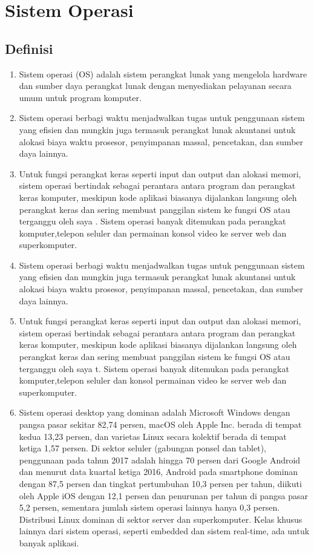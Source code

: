 \section{Sistem Operasi}
	\subsection{Definisi}
		\begin{enumerate}
			\item Sistem operasi (OS) adalah sistem perangkat lunak yang mengelola hardware dan sumber daya perangkat lunak dengan menyediakan pelayanan secara umum untuk program komputer.

			\item Sistem operasi berbagi waktu menjadwalkan tugas untuk penggunaan sistem yang efisien dan mungkin juga termasuk perangkat lunak akuntansi untuk alokasi biaya waktu prosesor, penyimpanan massal, pencetakan, dan sumber daya lainnya.
			\item Untuk fungsi perangkat keras seperti input dan output dan alokasi memori, sistem operasi bertindak sebagai perantara antara program dan perangkat keras komputer, meskipun kode aplikasi biasanya dijalankan langsung oleh perangkat keras dan sering membuat panggilan sistem ke fungsi OS atau terganggu oleh saya . Sistem operasi banyak ditemukan pada perangkat komputer,telepon seluler dan permainan konsol video ke server web dan superkomputer.

			\item Sistem operasi berbagi waktu menjadwalkan tugas untuk penggunaan sistem yang efisien dan mungkin juga termasuk perangkat lunak akuntansi untuk alokasi biaya waktu prosesor, penyimpanan massal, pencetakan, dan sumber daya lainnya.
			\item Untuk fungsi perangkat keras seperti input dan output dan alokasi memori, sistem operasi bertindak sebagai perantara antara program dan perangkat keras komputer, meskipun kode aplikasi biasanya dijalankan langsung oleh perangkat keras dan sering membuat panggilan sistem ke fungsi OS atau terganggu oleh saya t. Sistem operasi banyak ditemukan pada perangkat komputer,telepon seluler dan konsol permainan video ke server web dan superkomputer.

			\item Sistem operasi desktop yang dominan adalah Microsoft Windows dengan pangsa pasar sekitar 82,74 persen, macOS oleh Apple Inc. berada di tempat kedua 13,23 persen, dan varietas Linux secara kolektif berada di tempat ketiga 1,57 persen. Di sektor seluler (gabungan ponsel dan tablet), penggunaan pada tahun 2017 adalah hingga 70 persen dari Google Android dan menurut data kuartal ketiga 2016, Android pada smartphone dominan dengan 87,5 persen dan tingkat pertumbuhan 10,3 persen per tahun, diikuti oleh Apple iOS dengan 12,1 persen dan penurunan per tahun di pangsa pasar 5,2 persen, sementara jumlah sistem operasi lainnya hanya 0,3 persen. Distribusi Linux dominan di sektor server dan superkomputer. Kelas khusus lainnya dari sistem operasi, seperti embedded dan sistem real-time, ada untuk banyak aplikasi.
		\end{enumerate}
